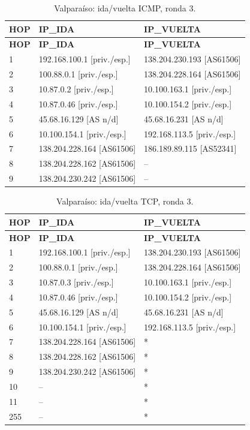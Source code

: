 \endgroup
\begingroup
\fontsize{9}{11}\selectfont
\begin{longtable}{p{0.95cm}p{7.075cm}p{7.075cm}}
\caption{Valparaíso: ida/vuelta ICMP, ronda 3.}\label{anexo:vuelta:138.204.230.242:ICMP:3} \\
\toprule
\textbf{HOP} & \textbf{IP\_\allowbreak{}IDA} & \textbf{IP\_\allowbreak{}VUELTA} \\ \midrule
\endfirsthead
\toprule
\textbf{HOP} & \textbf{IP\_\allowbreak{}IDA} & \textbf{IP\_\allowbreak{}VUELTA} \\ \midrule
\endhead
1 & 192.168.100.1 [priv./esp.] & 138.204.230.193 [AS61506] \\
2 & 100.88.0.1 [priv./esp.] & 138.204.228.164 [AS61506] \\
3 & 10.87.0.2 [priv./esp.] & 10.100.163.1 [priv./esp.] \\
4 & 10.87.0.46 [priv./esp.] & 10.100.154.2 [priv./esp.] \\
5 & 45.68.16.129 [AS n/d] & 45.68.16.231 [AS n/d] \\
6 & 10.100.154.1 [priv./esp.] & 192.168.113.5 [priv./esp.] \\
7 & 138.204.228.164 [AS61506] & 186.189.89.115 [AS52341] \\
8 & 138.204.228.162 [AS61506] & -- \\
9 & 138.204.230.242 [AS61506] & -- \\
\bottomrule
\end{longtable}
\endgroup
\begingroup
\fontsize{9}{11}\selectfont
\begin{longtable}{p{0.95cm}p{7.075cm}p{7.075cm}}
\caption{Valparaíso: ida/vuelta TCP, ronda 3.}\label{anexo:vuelta:138.204.230.242:TCP:3} \\
\toprule
\textbf{HOP} & \textbf{IP\_\allowbreak{}IDA} & \textbf{IP\_\allowbreak{}VUELTA} \\ \midrule
\endfirsthead
\toprule
\textbf{HOP} & \textbf{IP\_\allowbreak{}IDA} & \textbf{IP\_\allowbreak{}VUELTA} \\ \midrule
\endhead
1 & 192.168.100.1 [priv./esp.] & 138.204.230.193 [AS61506] \\
2 & 100.88.0.1 [priv./esp.] & 138.204.228.164 [AS61506] \\
3 & 10.87.0.3 [priv./esp.] & 10.100.163.1 [priv./esp.] \\
4 & 10.87.0.46 [priv./esp.] & 10.100.154.2 [priv./esp.] \\
5 & 45.68.16.129 [AS n/d] & 45.68.16.231 [AS n/d] \\
6 & 10.100.154.1 [priv./esp.] & 192.168.113.5 [priv./esp.] \\
7 & 138.204.228.164 [AS61506] & * \\
8 & 138.204.228.162 [AS61506] & * \\
9 & 138.204.230.242 [AS61506] & * \\
10 & -- & * \\
11 & -- & * \\
255 & -- & * \\
\bottomrule
\end{longtable}
